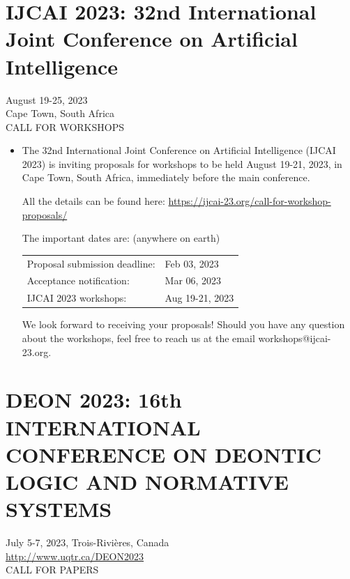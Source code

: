 \documentclass[prodmode,acmtecs]{acmsmall} %
\begin{document}
\section{IJCAI 2023: 32nd International Joint Conference on Artificial Intelligence}\label{IJCAI2023}  August 19-25, 2023\\ 
  Cape Town, South Africa\\ 
CALL FOR WORKSHOPS 

\begin{itemize}\item  The 32nd International Joint Conference on Artificial Intelligence (IJCAI 2023) is inviting proposals for workshops to be held August 19-21, 2023, in Cape Town, South Africa, immediately before the main conference. 
 
  All the details can be found here: \href{https://ijcai-23.org/call-for-workshop-proposals/}{https://ijcai-23.org/call-for-workshop-proposals/} 
 
  The important dates are: (anywhere on earth) 
 
\begin{tabulary}{\linewidth}{LL}Proposal submission deadline:  & Feb 03, 2023 \\
Acceptance notification:  & Mar 06, 2023 \\
IJCAI 2023 workshops:  & Aug 19-21, 2023 \\
\end{tabulary}
 
  We look forward to receiving your proposals! Should you have any question about the workshops, feel free to reach us at the email workshops@ijcai-23.org. 
 
\end{itemize}\section{DEON 2023: 16th INTERNATIONAL CONFERENCE ON DEONTIC LOGIC AND NORMATIVE SYSTEMS}\label{DEON2023}  July 5-7, 2023, Trois-Rivières, Canada\\ 
  \href{http://www.uqtr.ca/DEON2023}{http://www.uqtr.ca/DEON2023}\\ 
CALL FOR PAPERS 
\end{document}
